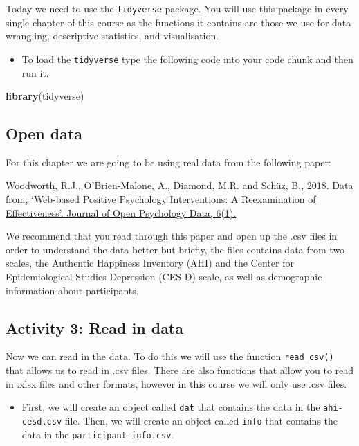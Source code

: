 \documentclass[]{book}
\newenvironment{Shaded}{\begin{snugshade}}{\end{snugshade}}
\newcommand{\KeywordTok}[1]{\textcolor[rgb]{0.13,0.29,0.53}{\textbf{#1}}}
\newcommand{\NormalTok}[1]{#1}
\providecommand{\tightlist}{%
  \setlength{\itemsep}{0pt}\setlength{\parskip}{0pt}}
\begin{document}
Today we need to use the \texttt{tidyverse} package. You will use this package in every single chapter of this course as the functions it contains are those we use for data wrangling, descriptive statistics, and visualisation.

\begin{itemize}
\tightlist
\item
  To load the \texttt{tidyverse} type the following code into your code chunk and then run it.
\end{itemize}

\begin{Shaded}
\begin{Highlighting}[]
\KeywordTok{library}\NormalTok{(tidyverse)}
\end{Highlighting}
\end{Shaded}

\hypertarget{open-data}{%
\subsection{Open data}\label{open-data}}

For this chapter we are going to be using real data from the following paper:

\href{https://openpsychologydata.metajnl.com/articles/10.5334/jopd.35/}{Woodworth, R.J., O'Brien-Malone, A., Diamond, M.R. and Schüz, B., 2018. Data from, `Web-based Positive Psychology Interventions: A Reexamination of Effectiveness'. Journal of Open Psychology Data, 6(1).}

We recommend that you read through this paper and open up the .csv files in order to understand the data better but briefly, the files contains data from two scales, the Authentic Happiness Inventory (AHI) and the Center for Epidemiological Studies Depression (CES-D) scale, as well as demographic information about participants.

\hypertarget{activity-3-read-in-data}{%
\subsection{Activity 3: Read in data}\label{activity-3-read-in-data}}

Now we can read in the data. To do this we will use the function \texttt{read\_csv()} that allows us to read in .csv files. There are also functions that allow you to read in .xlsx files and other formats, however in this course we will only use .csv files.

\begin{itemize}
\tightlist
\item
  First, we will create an object called \texttt{dat} that contains the data in the \texttt{ahi-cesd.csv} file. Then, we will create an object called \texttt{info} that contains the data in the \texttt{participant-info.csv}.
\end{itemize}
\end{document}
